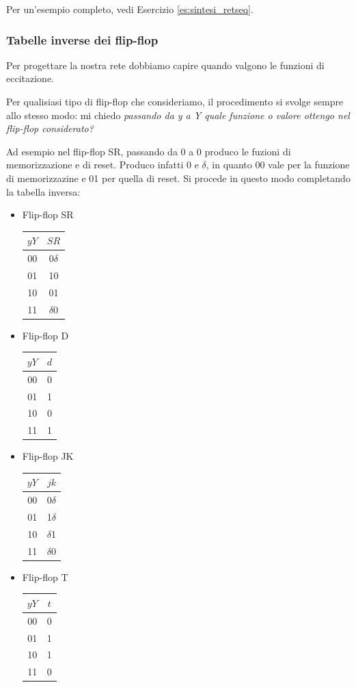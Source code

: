 Per un'esempio completo, vedi Esercizio \ref{es:sintesi_retseq}.

\subsubsection*{Tabelle inverse dei flip-flop}\label{sec:tabinvff}
Per progettare la nostra rete dobbiamo capire quando valgono le funzioni di eccitazione.

Per qualisiasi tipo di flip-flop che consideriamo, il procedimento si svolge sempre allo stesso modo: mi chiedo \textit{passando da y a Y quale funzione o valore ottengo nel flip-flop considerato?}

Ad esempio nel flip-flop SR, passando da 0 a 0 produco le fuzioni di memorizzazione e di reset. Produco infatti 0 e $\delta$, in quanto 00 vale per la funzione di memorizzazine e 01 per quella di reset. Si procede in questo modo completando la tabella inversa:
\begin{itemize}
    \item Flip-flop SR
    \begin{tabular}{c|c}
         $yY$&$SR$\\\hline
         00&0$\delta$\\
         01&10\\
         10&01\\
         11&$\delta$0
    \end{tabular}
    \item Flip-flop D
    \begin{tabular}{c|c}
         $yY$&$d$\\\hline
         00&0\\
         01&1\\
         10&0\\
         11&1
    \end{tabular}
    \item Flip-flop JK
    \begin{tabular}{c|c}
         $yY$&$jk$\\\hline
         00&0$\delta$\\
         01&1$\delta$\\
         10&$\delta$1\\
         11&$\delta$0
    \end{tabular}
    \item Flip-flop T
    \begin{tabular}{c|c}
         $yY$&$t$\\\hline
         00&0\\
         01&1\\
         10&1\\
         11&0
    \end{tabular}
    
\end{itemize}


